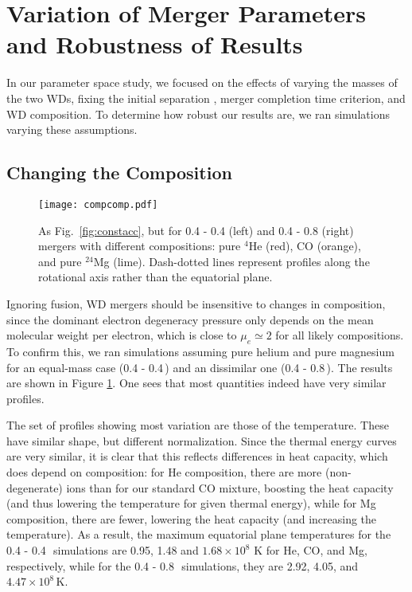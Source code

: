 \section{Variation of Merger Parameters and Robustness of Results}
\label{sec:variation}

In our parameter space study, we focused on the effects of varying the masses of the two WDs, fixing the initial separation {\azero}, merger completion time criterion, and WD composition.  To determine how robust our results are, we ran simulations varying these assumptions.

\subsection{Changing the Composition}

\begin{figure}
\centering
\texttt{[image: compcomp.pdf]}
\caption{As Fig.~\ref{fig:constacc}, but for 0.4 - 0.4 {\Msun} (left) and 0.4 - 0.8 {\Msun} (right) mergers with different compositions: pure $^4$He (red), CO (orange), and pure $^{24}$Mg (lime).  Dash-dotted lines represent profiles along the rotational axis rather than the equatorial plane.}
\label{fig:compcomp}
\end{figure}

Ignoring fusion, WD mergers should be insensitive to changes in composition, since the dominant electron degeneracy pressure only depends on the mean molecular weight per electron, which is close to $\mu_e\simeq2$ for all likely compositions.  To confirm this, we ran simulations assuming pure helium and pure magnesium for an equal-mass case (0.4 - 0.4\,\Msun) and an dissimilar one (0.4 - 0.8\,\Msun).  The results are shown in Figure \ref{fig:compcomp}.  One sees that most quantities indeed have very similar profiles.

The set of profiles showing most variation are those of the temperature.  These have similar shape, but different normalization.  Since the thermal energy curves are very similar, it is clear that this reflects differences in heat capacity, which does depend on composition: for He composition, there are more (non-degenerate) ions than for our standard CO mixture, boosting the heat capacity (and thus lowering the temperature for given thermal energy), while for Mg composition, there are fewer, lowering the heat capacity (and increasing the temperature).  As a result, the maximum equatorial plane temperatures for the 0.4 - 0.4\,\Msun\ simulations are 0.95, 1.48 and $1.68\times10^8$ K for He, CO, and Mg, respectively, while for the 0.4 - 0.8\,\Msun\ simulations, they are 2.92, 4.05, and $4.47\times10^8\,$K.

